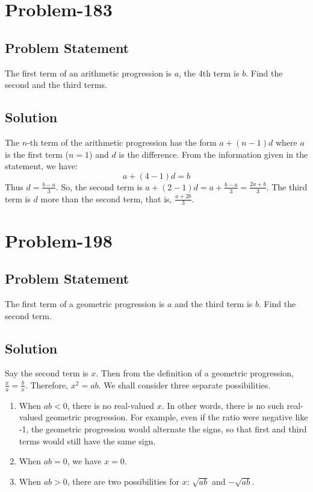 \documentclass[12pt]{article}
\begin{document}
\section*{Problem-183}
\subsection*{Problem Statement}
The first term of an arithmetic progression is $a$, the 4th term is $b$. Find the second and the third terms.
\subsection*{Solution}
The $n$-th term of the arithmetic progression has the form $a+(n-1)d$ where $a$ is the first term ($n=1$) and $d$ is the difference. From the information given in the statement, we have:
\[
a + (4-1)d = b
\]
Thus $d = \frac{b-a}{3}$. So, the second term is $a+(2-1)d = a+\frac{b-a}{3} = \frac{2a+b}{3}$. The third term is $d$ more than the second term, that is, $\frac{a+2b}{3}$.

\section*{Problem-198}
\subsection*{Problem Statement}
The first term of a geometric progression is $a$ and the third term is $b$. Find the second term.
\subsection*{Solution}
Say the second term is $x$. Then from the definition of a geometric progression, $\frac{x}{a} = \frac{b}{x}$. Therefore, $x^2 = ab$. We shall consider three separate possibilities.
\begin{enumerate}
\item When $ab < 0$, there is no real-valued $x$. In other words, there is no such real-valued geometric progression. For example, even if the ratio were negative like -1, the geometric progression would alternate the signs, so that first and third terms would still have the same sign.
\item When $ab = 0$, we have $x = 0$.
\item When $ab > 0$, there are two possibilities for $x$: $\sqrt{ab}$ and $-\sqrt{ab}$. 
\end{enumerate}
\end{document}
